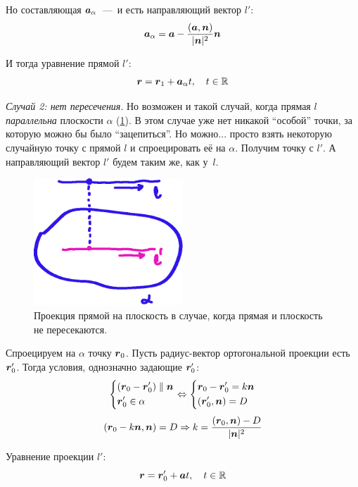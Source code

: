 \documentclass[a4paper,12pt]{article}
\begin{document}
\begin{solution}
    Но составляющая $\boldsymbol a_{\alpha}$~---~и есть направляющий вектор $l'$:
    \[
      \boldsymbol a_{\alpha} = \boldsymbol a - \frac{(\boldsymbol a, \boldsymbol n)}{|\boldsymbol n|^2} \boldsymbol n
    \]
    
    И тогда уравнение прямой $l'$:
    \[
      \boldsymbol r = \boldsymbol r_1 + \boldsymbol a_{\alpha} t,\quad t \in \operatorname{\mathbb R}
    \]
    
    \medskip
    
    \emph{Случай 2: нет пересечения}.
    Но возможен и такой случай, когда прямая $l$ \emph{параллельна} плоскости $\alpha$ (\ref{fig:project-line-when-no-intersect}).
    В этом случае уже нет никакой ``особой'' точки, за которую можно бы было ``зацепиться''.
    Но можно... просто взять некоторую случайную точку с прямой $l$ и спроецировать её на $\alpha$.
    Получим точку с $l'$.
    А направляющий вектор $l'$ будем таким же, как у~$l$.
    
    \begin{figure}[h]
      \centering
      
      \includegraphics[width=0.5\textwidth]{project-line-when-no-intersect}
      
      \caption{Проекция прямой на плоскость в случае, когда прямая и плоскость не пересекаются.}
      \label{fig:project-line-when-no-intersect}
    \end{figure}
    
    Спроецируем на $\alpha$ точку $\boldsymbol r_0$.
    Пусть радиус-вектор ортогональной проекции есть $\boldsymbol r_0'$.
    Тогда условия, однозначно задающие $\boldsymbol r_0'$:
    \[
      \left\{
        \begin{aligned}
          &(\boldsymbol r_0 - \boldsymbol r_0') \parallel \boldsymbol n\\
          &\boldsymbol r_0' \in \alpha
        \end{aligned}
      \right. \Leftrightarrow
      \left\{
        \begin{aligned}
          &\boldsymbol r_0 - \boldsymbol r_0' = k \boldsymbol n\\
          &(\boldsymbol r_0', \boldsymbol n) = D
        \end{aligned}
      \right.
    \]
    \[
      (\boldsymbol r_0 - k \boldsymbol n, \boldsymbol n) = D \Rightarrow k = \frac{(\boldsymbol r_0, \boldsymbol n) - D}{|\boldsymbol n|^2}
    \]
    
    Уравнение проекции $l'$:
    \[
      \boldsymbol r = \boldsymbol r_0' + \boldsymbol a t,\quad t \in \operatorname{\mathbb R}
    \]
  \end{solution}
  
\end{document}
